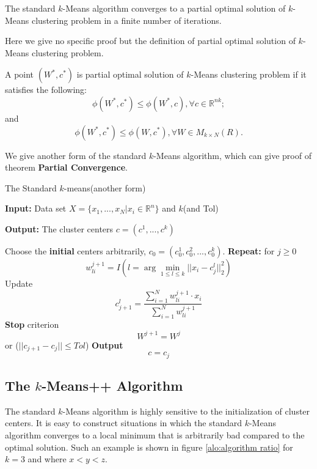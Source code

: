          \begin{theorem}
         The standard $k$-Means algorithm converges to a partial optimal solution of $k$-Means clustering problem in a finite number of iterations.
         \end{theorem}

         Here we give no specific proof but the definition of partial optimal solution of $k$-Means clustering problem.
         \begin{definition}
         A point $(W^{*}, c^{*})$ is partial optimal solution of $k$-Means clustering problem if it satisfies the following:
         \begin{equation}
         \phi(W^{*}, c^{*}) \leq \phi(W^{*}, c), \forall c \in \mathbb{R}^{nk};
         \end{equation}
         and
         \begin{equation}
         \phi(W^{*}, c^{*}) \leq \phi(W, c^{*}), \forall W \in M_{k \times N}(R).
         \end{equation}
         \end{definition}

         We give another form of the standard $k$-Means algorithm, which can give proof of theorem \textbf{Partial Convergence}.

	 \begin{algorithm}
		\caption{The Standard $k$-means(another form)}
	         \label{alo:kmeans2}
		\textbf{Input:}  Data set $X=\lbrace x_{1},...,x_{N}| x_{i}\in\mathbb{R}^n\rbrace$ and $k$(and Tol)
		
		\textbf{Output:} The cluster centers $c = ( c^{1},..., c^{k})$
		
		\begin{algorithmic}[1]
		\State Choose the \textbf{initial} centers arbitrarily, $c_{0}=(c_{0}^{1},c_{0}^{2},...,c_{0}^{k})$.
		\State \textbf{Repeat:} for $j \geq 0$
                                  $$
			w_{li}^{j+1} = I(l = \arg\min_{1 \leq l \leq k} ||x_{i}-c_{j}^{l}||_{2}^{2})
				$$
				Update
				$$
			c_{j+1}^{l} = \frac{\sum_{i=1}^{N} w_{li}^{j+1} \cdot x_{i}}{\sum_{i=1}^{N} w_{li}^{j+1} }
				$$
			\textbf{Stop} criterion $$ W^{j+1} = W^{j}$$ or ($||c_{j+1}-c_{j}|| \leq Tol$)
		\State \textbf{Output} $$c = c_{j}$$ 
	   \end{algorithmic}
	   \end{algorithm}

	\subsection{The $k$-Means++ Algorithm}
	The standard $k$-Means algorithm is highly sensitive to the initialization of cluster centers. It is easy to construct situations in which the standard $k$-Means algorithm converges to a local minimum that is arbitrarily bad compared to the optimal solution. Such an example is shown in figure \ref{alo:algorithm ratio} for $k=3$ and where $x<y<z$.

